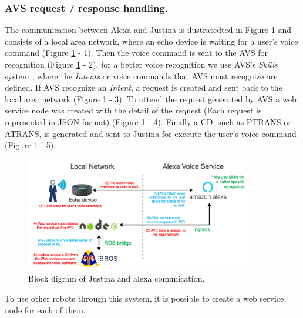 \documentclass{llncs}
\begin{document}
\subsubsection{AVS request / response handling.}

The communication between Alexa and Justina is ilustratedted in Figure \ref{fig:alexaconexion} and 
consists of a local area network, 
where an echo device is waiting for a user's voice command (Figure \ref{fig:alexaconexion} - 1). 
Then the voice command is sent to the AVS for recognition (Figure \ref{fig:alexaconexion} - 2), 
for a better voice recognition we use AVS's \textit{Skills} system \cite{skills}, where the \textit{Intents} or voice commands that AVS must recognize are defined.
If AVS recognize an \textit{Intent}, 
a request is created and sent back to the local area network (Figure \ref{fig:alexaconexion} - 3). 
To attend the request generated by AVS a web service node was created with the detail of the request (Each request is represented in JSON format) (Figure \ref{fig:alexaconexion} - 4). 
Finally a CD, such as PTRANS or ATRANS, is generated and sent to Justina for execute the user's voice command (Figure \ref{fig:alexaconexion} - 5).
\begin{figure}[h]
	\centering
	\includegraphics[angle=0, height=5cm, width=10cm]{Figures/alexa3.png}
	\caption{Block digram of Justina and alexa comunication.}
	\label{fig:alexaconexion}
\end{figure}

To use other robots through this system, 
it is possible to create a web service node for each of them. 


\end{document}
